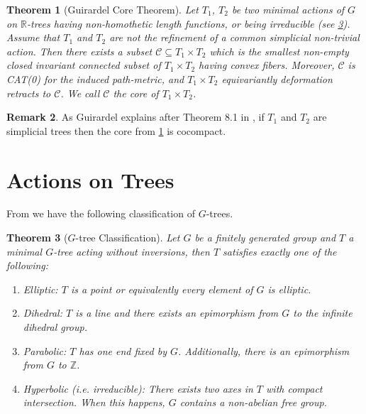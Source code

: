 \documentclass[12pt,parskip=full]{report}
\theoremstyle{plain}
\newtheorem{thm}{Theorem}[section]
\theoremstyle{definition}
\newtheorem{rmk}[thm]{Remark}
\begin{document}
\begin{thm}
    [Guirardel Core Theorem]
    \label{thm:guirardelcore}
    Let \(T_1\), \(T_2\) be two minimal actions of \(G\) on \(\mathbb{R}\)-trees having non-homothetic length functions, or being irreducible (see \ref{thm:classification}). Assume that \(T_1\) and \(T_2\) are not the refinement of a common simplicial non-trivial action. Then there exists a subset \(\mathscr{C}\subseteq T_1\times T_2\) which is the smallest non-empty closed invariant connected subset of \(T_1\times T_2\) having convex fibers. Moreover, \(\mathscr{C}\) is CAT(0) for the induced path-metric, and \(T_1\times T_2\) equivariantly deformation retracts to \(\mathscr{C}\). We call \(\mathscr{C}\) the core of \(T_1\times T_2\).
\end{thm}

\begin{rmk}
    \label{guirardelcocompact}
    As Guirardel explains after Theorem 8.1 in \cite{guirardelcorepaper}, if \(T_1\) and \(T_2\) are simplicial trees then the core from \ref{thm:guirardelcore} is cocompact.
\end{rmk}



\section{Actions on Trees}

From \cite{boundingcomplexity} we have the following classification of \(G\)-trees.
\begin{thm}
    [\(G\)-tree Classification]
    \label{thm:classification}
    Let \(G\) be a finitely generated group and \(T\) a minimal \(G\)-tree acting without inversions, then \(T\) satisfies exactly one of the following:
    
    \begin{enumerate}
        \item Elliptic: \(T\) is a point or equivalently every element of \(G\) is elliptic.
        \item Dihedral: \(T\) is a line and there exists an epimorphism from \(G\) to the infinite dihedral group.
        \item Parabolic: \(T\) has one end fixed by \(G\). Additionally, there is an epimorphism from \(G\) to \(\mathbb{Z}\).
        \item Hyperbolic (i.e. irreducible): There exists two axes in \(T\) with compact intersection. When this happens, \(G\) contains a non-abelian free group.
    \end{enumerate}
\end{thm}
\end{document}
